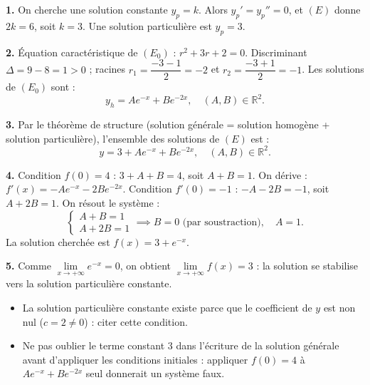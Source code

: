 \documentclass[11pt]{article}
\begin{document}
\begin{corrige}
\textbf{1.} On cherche une solution constante $y_p = k$. Alors $y_p' = y_p'' = 0$, et $(E)$ donne $2k = 6$, soit $k = 3$. Une solution particulière est $\boxed{y_p = 3}$.

\textbf{2.} Équation caractéristique de $(E_0)$ : $r^2 + 3r + 2 = 0$. Discriminant $\Delta = 9 - 8 = 1 > 0$ ; racines $r_1 = \dfrac{-3-1}{2} = -2$ et $r_2 = \dfrac{-3+1}{2} = -1$. Les solutions de $(E_0)$ sont :
\[ y_h = Ae^{-x} + Be^{-2x},\quad (A,B) \in \mathbb{R}^2. \]

\textbf{3.} Par le théorème de structure (solution générale = solution homogène + solution particulière), l'ensemble des solutions de $(E)$ est :
\[ \boxed{y = 3 + Ae^{-x} + Be^{-2x},\quad (A,B) \in \mathbb{R}^2.} \]

\textbf{4.} Condition $f(0) = 4$ : $3 + A + B = 4$, soit $A + B = 1$.
On dérive : $f'(x) = -Ae^{-x} - 2Be^{-2x}$. Condition $f'(0) = -1$ : $-A - 2B = -1$, soit $A + 2B = 1$.
On résout le système :
\[ \begin{cases} A + B = 1 \\ A + 2B = 1 \end{cases} \implies B = 0 \text{ (par soustraction)}, \quad A = 1. \]
La solution cherchée est $\boxed{f(x) = 3 + e^{-x}}$.

\textbf{5.} Comme $\lim\limits_{x \to +\infty} e^{-x} = 0$, on obtient $\boxed{\lim\limits_{x \to +\infty} f(x) = 3}$ : la solution se stabilise vers la solution particulière constante.

\begin{attention}
\begin{itemize}
\item La solution particulière constante existe parce que le coefficient de $y$ est non nul ($c = 2 \neq 0$) : citer cette condition.
\item Ne pas oublier le terme constant $3$ dans l'écriture de la solution générale avant d'appliquer les conditions initiales : appliquer $f(0) = 4$ à $Ae^{-x} + Be^{-2x}$ seul donnerait un système faux.
\end{itemize}
\end{attention}
\end{corrige}
\end{document}
